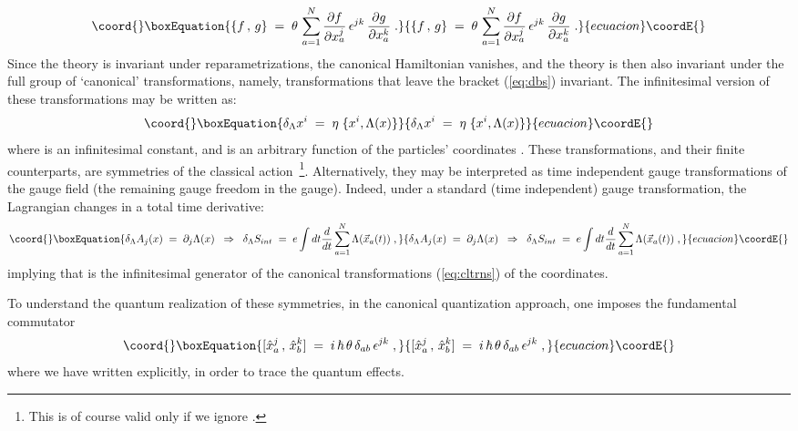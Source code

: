 \documentclass[a4paper,12pt]{article}
\begin{document}
\begin{equation}\coord{}\boxEquation{
  \label{eq:dbsg}
\{f \,,\, g\}\;=\; \theta \, \sum_{a=1}^N  
\frac{\partial f}{\partial x^j_a}\, \epsilon^{jk} \, \frac{\partial
g}{\partial x^k_a}\;. 
}{
  \{f \,,\, g\}\;=\; \theta \, \sum_{a=1}^N  
\frac{\partial f}{\partial x^j_a}\, \epsilon^{jk} \, \frac{\partial
g}{\partial x^k_a}\;. 
}{ecuacion}\coordE{}\end{equation}
Since the theory is invariant under reparametrizations, the
canonical
Hamiltonian vanishes, and the theory is then also invariant under
the
full group of `canonical' transformations, namely, transformations
that leave the bracket (\ref{eq:dbs}) invariant. The infinitesimal
version of these transformations may be written as:
\begin{equation}\coord{}\boxEquation{
  \label{eq:cltrns}
\delta_\Lambda x^i \;=\; \eta \; \{ x^i , \Lambda(x)\}
}{
  \delta_\Lambda x^i \;=\; \eta \; \{ x^i , \Lambda(x)\}
}{ecuacion}\coordE{}\end{equation}
where \myHighlight{$\eta$}\coordHE{} is an infinitesimal constant, and \coordHE{} is an
arbitrary
function of the particles' coordinates \coordHE{}.  These
transformations, and their finite counterparts, are symmetries of
the
classical action~\footnote{This is of course valid only if we
ignore
  \coordHE{}.}. Alternatively, they may be interpreted as time
independent
gauge transformations of the gauge field (the remaining gauge
freedom
in the \coordHE{} gauge).  Indeed, under a standard (time independent)
gauge transformation, the Lagrangian changes in a total time
derivative:
\begin{equation}\coord{}\boxEquation{
  \label{eq:gtc}
\delta_\Lambda A_j (x) \;=\; \partial_j \Lambda (x)
\;\;\Rightarrow\;\;
\delta_\Lambda S_{int} \;=\; e \int dt \frac{d}{dt} \sum_{a=1}^N
\Lambda({\vec x}_a(t)) \;,
}{
  \delta_\Lambda A_j (x) \;=\; \partial_j \Lambda (x)
\;\;\Rightarrow\;\;
\delta_\Lambda S_{int} \;=\; e \int dt \frac{d}{dt} \sum_{a=1}^N
\Lambda({\vec x}_a(t)) \;,
}{ecuacion}\coordE{}\end{equation}
implying that \myHighlight{$\Lambda$}\coordHE{} is the infinitesimal generator of the
canonical
transformations (\ref{eq:cltrns}) of the coordinates.

To understand the quantum realization of these symmetries, in the
canonical quantization approach, one imposes the fundamental
commutator
\begin{equation}\coord{}\boxEquation{ 
 \label{eq:qcs}
[ {\hat x}^j_a \,,\, {\hat x}^k_b ] \;=\; i \,\hbar \,\theta
\,\delta_{ab} \,
\epsilon^{jk} \;,
}{ 
 [ {\hat x}^j_a \,,\, {\hat x}^k_b ] \;=\; i \,\hbar \,\theta
\,\delta_{ab} \,
\epsilon^{jk} \;,
}{ecuacion}\coordE{}\end{equation}
where we have written \myHighlight{$\hbar$}\coordHE{} explicitly, in order to trace the
quantum
effects.
 
\end{document}
